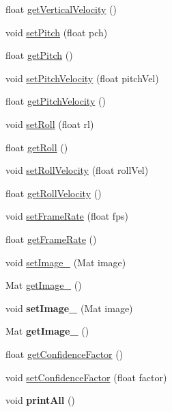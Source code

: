 \begin{DoxyCompactItemize}
\item 
float \hyperlink{classVelocityData_a5d59215c5ce71fae005f9c18090624f3}{get\+Vertical\+Velocity} ()
\item 
void \hyperlink{classVelocityData_afd0254fbf317e060207cca8f21ecd0cf}{set\+Pitch} (float pch)
\item 
float \hyperlink{classVelocityData_aa185960e93ad02320782a28016b2c1ff}{get\+Pitch} ()
\item 
void \hyperlink{classVelocityData_a42a7ec436cd1c28424c1d65e36146c79}{set\+Pitch\+Velocity} (float pitch\+Vel)
\item 
float \hyperlink{classVelocityData_ad016bf41d5000b3d827ddf489506f4dd}{get\+Pitch\+Velocity} ()
\item 
void \hyperlink{classVelocityData_aafa2cb5c5997e304d38e5be805babc37}{set\+Roll} (float rl)
\item 
float \hyperlink{classVelocityData_a89225f37341cc568e9df605dbebdb35e}{get\+Roll} ()
\item 
void \hyperlink{classVelocityData_a2980599e8a5257a8babbdac48dab43ae}{set\+Roll\+Velocity} (float roll\+Vel)
\item 
float \hyperlink{classVelocityData_afcc4743bf6233c329e122310d1e28689}{get\+Roll\+Velocity} ()
\item 
void \hyperlink{classVelocityData_ad089fc7de495bf469b6707f4b6f8c35c}{set\+Frame\+Rate} (float fps)
\item 
float \hyperlink{classVelocityData_a30a6d159a415d260c38daa154f68e2de}{get\+Frame\+Rate} ()
\item 
void \hyperlink{classVelocityData_a5bf9941e043920a9e9cd7eb12226d9ad}{set\+Image\+\_} (Mat image)
\item 
Mat \hyperlink{classVelocityData_a73a11db5baa02a5f450f6a8ae8ffbc57}{get\+Image\+\_} ()
\item 
\hypertarget{classVelocityData_a091c56504b549df88c21fc9dc480073c}{void {\bfseries set\+Image\+\_} (Mat image)}\label{classVelocityData_a091c56504b549df88c21fc9dc480073c}

\item 
\hypertarget{classVelocityData_afe611affee75df2a6488f7de918e635e}{Mat {\bfseries get\+Image\+\_} ()}\label{classVelocityData_afe611affee75df2a6488f7de918e635e}

\item 
float \hyperlink{classVelocityData_adda527896453037f025e84f0de900c70}{get\+Confidence\+Factor} ()
\item 
void \hyperlink{classVelocityData_ae867ac28be4c391f9b804070d8b9686a}{set\+Confidence\+Factor} (float factor)
\item 
\hypertarget{classVelocityData_ad7b3f1b154f3be6d06dca9c0c13b03d0}{void {\bfseries print\+All} ()}\label{classVelocityData_ad7b3f1b154f3be6d06dca9c0c13b03d0}

\end{DoxyCompactItemize}


